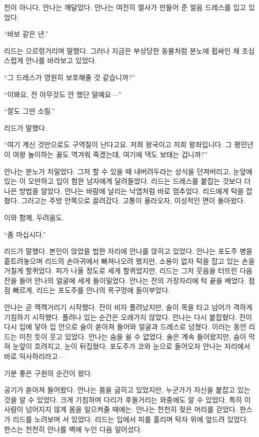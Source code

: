 천이 아니다, 안나는 깨달았다. 안나는 여전히 엘사가 만들어 준 얼음 드레스를 입고 있었다.

``바보 같은 년.''

리드는 으르렁거리며 말했다. 그러나 지금은 부상당한 동물처럼 분노에 휩싸인 채 조심스럽게 안나를 바라보고 있었다.

``그 드레스가 영원히 보호해줄 것 같습니까?''

``이봐요, 전 아무것도 안 했단 말예요—''

``잘도 그딴 소릴.''

리드가 말했다.

``여기 계신 것만으로도 구역질이 난다고요. 저희 왕국이고 저희 왕좌입니다. 그 평민년이 여왕 놀이하는 꼴도 역겨워 죽겠는데, 여기에 댁도 보태는 겁니까?''

안나는 분노가 치밀었다. 그저 할 수 있을 때 내버려두라는 상식을 던져버리고, 눈앞에 있는 이 오만하고 입이 험한 남자에게 달려들었다. 리드는 드레스를 붙잡는 것보다 더 나은 방법을 알았다. 안나는 바람에 날리는 낙엽처럼 바로 멈추었다. 리드에게 턱을 잡혔다. 그러고는 주방 안쪽으로 끌려갔다. 고통이 올라오자, 이성적인 면이 돌아왔다.

이와 함께, 두려움도.

``좀 마십시다.''

리드가 말했다. 본인이 앉았을 법한 자리에 안나를 앉히고 있었다. 안나는 포도주 병을 흩트려놓으며 리드의 손아귀에서 빠져나오려 했지만, 소용이 없자 턱을 잡고 있는 손을 거칠게 할퀴었다. 피가 나올 정도로 세게 할퀴었지만, 리드는 그저 웃음을 터뜨린 다음 잔을 들어 안나의 얼굴에 세게 들이밀었다. 안나는 잔의 가장자리에 턱 끝을 베었다. 점점 빠르게, 리드는 포도주를 안나의 목구멍에 들이부었다.

안나는 곧 캑캑거리기 시작했다. 잔이 비자 풀려났지만, 술이 목을 타고 넘어가 격하게 기침하기 시작했다. 풀려나 있는 순간은 오래가지 않았다. 안나는 다시 붙잡혔다. 잔이 다시 입에 닿아 입 안으로 술이 쏟아져 들어와 얼굴과 드레스로 넘쳤다. 이러는 동안 리드는 미친 듯이 웃고 있었다. 안나는 숨을 쉴 수 없었다. 술은 계속 들어왔지만, 숨이 막혀 눈앞이 흐려지고, 눈이 뒤집혔다. 포도주가 코와 눈으로 들어오자 안나는 자리에서 바로 익사하리라고—

기분 좋은 구원의 순간이 왔다.

공기가 쏟아져 들어왔다. 안나는 몸을 굽히고 있었지만, 누군가가 자신을 붙잡고 있는 것을 알 수 있었다. 크게 기침하며 다리가 후들거리는 와중에도 알 수 있었다. 특히 이 사람이 넘어지지 않게 몸을 일으켜줄 때에는. 안나는 천천히 젖은 머리를 걷었다. 한스가 리드를 노려보며 서 있었다. 리드는 입에서 피를 흘리며 탁자 위에 엎드려 있었다. 한스는 천천히 안나를 벽에 누인 다음 일어섰다.

